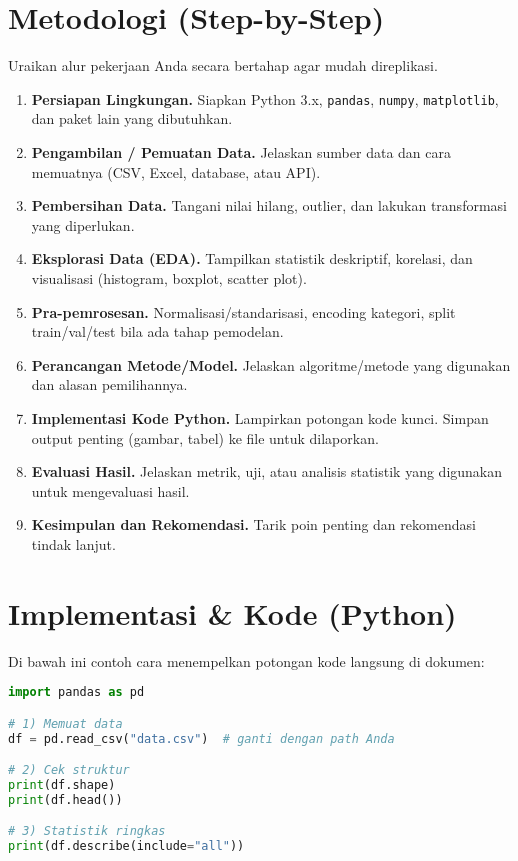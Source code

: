 \documentclass[11pt,a4paper]{article}
\begin{document}
\section{Metodologi (Step-by-Step)}
Uraikan alur pekerjaan Anda secara bertahap agar mudah direplikasi.

\begin{enumerate}[label=\textbf{Langkah \arabic*:}, leftmargin=*, itemsep=4pt]
  \item \textbf{Persiapan Lingkungan.} Siapkan Python 3.x, \texttt{pandas}, \texttt{numpy}, \texttt{matplotlib}, dan paket lain yang dibutuhkan.
  \item \textbf{Pengambilan / Pemuatan Data.} Jelaskan sumber data dan cara memuatnya (CSV, Excel, database, atau API).
  \item \textbf{Pembersihan Data.} Tangani nilai hilang, outlier, dan lakukan transformasi yang diperlukan.
  \item \textbf{Eksplorasi Data (EDA).} Tampilkan statistik deskriptif, korelasi, dan visualisasi (histogram, boxplot, scatter plot).
  \item \textbf{Pra-pemrosesan.} Normalisasi/standarisasi, encoding kategori, split train/val/test bila ada tahap pemodelan.
  \item \textbf{Perancangan Metode/Model.} Jelaskan algoritme/metode yang digunakan dan alasan pemilihannya.
  \item \textbf{Implementasi Kode Python.} Lampirkan potongan kode kunci. Simpan output penting (gambar, tabel) ke file untuk dilaporkan.
  \item \textbf{Evaluasi Hasil.} Jelaskan metrik, uji, atau analisis statistik yang digunakan untuk mengevaluasi hasil.
  \item \textbf{Kesimpulan dan Rekomendasi.} Tarik poin penting dan rekomendasi tindak lanjut.
\end{enumerate}

\section{Implementasi \& Kode (Python)}
Di bawah ini contoh cara menempelkan potongan kode langsung di dokumen:
\begin{lstlisting}[language=Python, caption={Contoh kode pemuatan dan ringkasan data.}]
import pandas as pd

# 1) Memuat data
df = pd.read_csv("data.csv")  # ganti dengan path Anda

# 2) Cek struktur
print(df.shape)
print(df.head())

# 3) Statistik ringkas
print(df.describe(include="all"))
\end{lstlisting}
\end{document}
